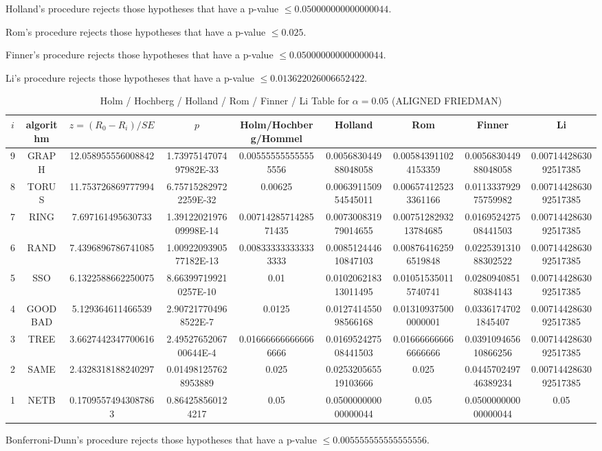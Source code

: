 \documentclass[a4paper,10pt]{article}
\begin{document}
\begin{landscape}
Holland's procedure rejects those hypotheses that have a p-value $\le0.050000000000000044$.


Rom's procedure rejects those hypotheses that have a p-value $\le0.025$.


Finner's procedure rejects those hypotheses that have a p-value $\le0.050000000000000044$.


Li's procedure rejects those hypotheses that have a p-value $\le0.013622026006652422$.



\newpage

\begin{table}[!htp]
\centering\scriptsize
\caption{Holm / Hochberg / Holland / Rom / Finner / Li Table for $\alpha=0.05$ (ALIGNED FRIEDMAN)}
\begin{tabular}{ccccccccc}
$i$&algorithm&$z=(R_0 - R_i)/SE$&$p$&Holm/Hochberg/Hommel&Holland&Rom&Finner&Li\\
\hline
9& GRAPH&12.058955556008842&1.7397514707497982E-33&0.005555555555555556&0.005683044988048058&0.005843911024153359&0.005683044988048058&0.0071442863092517385\\
8& TORUS&11.753726869777994&6.757152829722259E-32&0.00625&0.006391150954545011&0.006574125233361166&0.011333792975759982&0.0071442863092517385\\
7& RING&7.697161495630733&1.3912202197609998E-14&0.0071428571428571435&0.007300831979014655&0.0075128293213784685&0.016952427508441503&0.0071442863092517385\\
6& RAND&7.4396896786741085&1.0092209390577182E-13&0.008333333333333333&0.008512444610847103&0.008764162596519848&0.022539131088302522&0.0071442863092517385\\
5& SSO&6.1322588662250075&8.663997199210257E-10&0.01&0.010206218313011495&0.010515350115740741&0.028094085180384143&0.0071442863092517385\\
4& GOODBAD&5.129364611466539&2.907217704968522E-7&0.0125&0.012741455098566168&0.013109375000000001&0.03361747021845407&0.0071442863092517385\\
3& TREE&3.6627442347700616&2.4952765206700644E-4&0.016666666666666666&0.016952427508441503&0.016666666666666666&0.039109465610866256&0.0071442863092517385\\
2& SAME&2.4328318188240297&0.014981257628953889&0.025&0.025320565519103666&0.025&0.044570249746389234&0.0071442863092517385\\
1& NETB&0.17095574943087863&0.864258560124217&0.05&0.050000000000000044&0.05&0.050000000000000044&0.05\\
\hline
\end{tabular}
\end{table}
Bonferroni-Dunn's procedure rejects those hypotheses that have a p-value $\le0.005555555555555556$.



\end{landscape}
\end{document}

